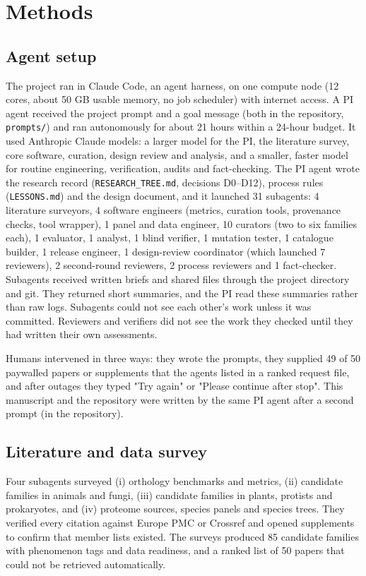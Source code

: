 \section*{Methods}

\subsection*{Agent setup}
The project ran in Claude Code, an agent harness, on one compute node (12 cores, about 50 GB usable memory, no job
scheduler) with internet access. A PI agent received the project prompt and a goal message (both in the repository,
\texttt{prompts/}) and ran autonomously for about 21 hours within a 24-hour budget. It used Anthropic Claude models: a larger model for the PI, the
literature survey, core software, curation, design review and analysis, and a smaller, faster model for routine
engineering, verification, audits and fact-checking. The PI agent wrote the research record
(\texttt{RESEARCH\_TREE.md}, decisions D0--D12), process rules (\texttt{LESSONS.md}) and the design document, and it
launched 31 subagents: 4 literature surveyors, 4 software engineers (metrics, curation tools, provenance checks, tool
wrapper), 1 panel
and data engineer, 10 curators (two to six families each), 1 evaluator, 1 analyst, 1 blind verifier, 1 mutation tester,
1 catalogue builder, 1 release engineer, 1 design-review coordinator (which launched 7 reviewers), 2 second-round
reviewers, 2 process reviewers and 1 fact-checker. Subagents received written briefs and shared files through the project directory and git. They returned short
summaries, and the PI read these summaries rather than raw logs. Subagents could not see
each other's work unless it was committed. Reviewers and verifiers did not see the work they checked until they had
written their own assessments.

Humans intervened in three ways: they wrote the prompts, they supplied 49 of 50 paywalled papers or supplements that the
agents listed in a ranked request file, and after outages they typed "Try again" or "Please continue after stop". This
manuscript and the repository were written by the same PI agent after a second prompt (in the repository).

\subsection*{Literature and data survey}
Four subagents surveyed (i) orthology benchmarks and metrics, (ii) candidate families in animals and fungi, (iii)
candidate families in plants, protists and prokaryotes, and (iv) proteome sources, species panels and species trees.
They verified every citation against Europe PMC or Crossref and opened supplements to confirm that member lists
existed. The surveys produced 85 candidate families with phenomenon tags and data readiness, and a ranked list of 50
papers that could not be retrieved automatically.

